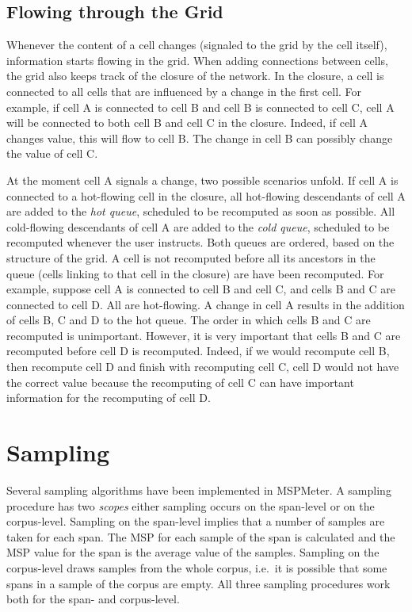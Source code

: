 \documentclass{article}
\begin{document}
\subsection{Flowing through the Grid}

Whenever the content of a cell changes (signaled to the grid by the cell itself), information starts flowing in the grid. When adding connections between cells, the grid also keeps track of the closure of the network. In the closure, a cell is connected to all cells that are influenced by a change in the first cell. For example, if cell A is connected to cell B and cell B is connected to cell C, cell A will be connected to both cell B and cell C in the closure. Indeed, if cell A changes value, this will flow to cell B. The change in cell B can possibly change the value of cell C. 

At the moment cell A signals a change, two possible scenarios unfold. If cell A is connected to a hot-flowing cell in the closure, all hot-flowing descendants of cell A are added to the \emph{hot queue}, scheduled to be recomputed as soon as possible. All cold-flowing descendants of cell A are added to the \emph{cold queue}, scheduled to be recomputed whenever the user instructs. Both queues are ordered, based on the structure of the grid. A cell is not recomputed before all its ancestors in the queue (cells linking to that cell in the closure) are have been recomputed. For example, suppose cell A is connected to cell B and cell C, and cells B and C are connected to cell D. All are hot-flowing. A change in cell A results in the addition of cells B, C and D to the hot queue. The order in which cells B and C are recomputed is unimportant. However, it is very important that cells B and C are recomputed before cell D is recomputed. Indeed, if we would recompute cell B, then recompute cell D and finish with recomputing cell C, cell D would not have the correct value because the recomputing of cell C can have important information for the recomputing of cell D. 



\section{Sampling}

Several sampling algorithms have been implemented in MSPMeter. A sampling procedure has two \emph{scopes} either sampling occurs on the span-level or on the corpus-level. Sampling on the span-level implies that a number of samples are taken for each span. The MSP for each sample of the span is calculated and the MSP value for the span is the average value of the samples. Sampling on the corpus-level draws samples from the whole corpus, i.e.\ it is possible that some spans in a sample of the corpus are empty. All three sampling procedures work both for the span- and corpus-level. 
\end{document}
